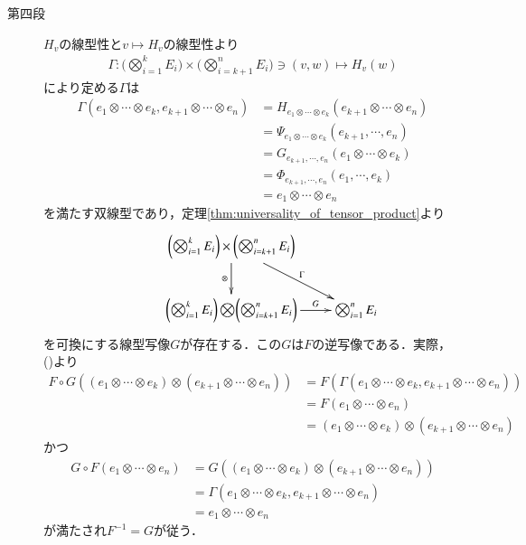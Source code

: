\begin{prf}
\begin{description}
			\item[第四段]
				$H_v$の線型性と$v \longmapsto H_v$の線型性より
				\begin{align}
					\Gamma:\biggl( \bigotimes_{i=1}^k E_i \biggr) \times \biggl( \bigotimes_{i=k+1}^n E_i \biggr) \ni (v,w) \longmapsto H_v(w)
				\end{align}
				により定める$\Gamma$は
				\begin{align}
					\Gamma(e_1 \otimes \cdots \otimes e_k, e_{k+1} \otimes \cdots \otimes e_n) 
					&= H_{e_1 \otimes \cdots \otimes e_k}\left(e_{k+1} \otimes \cdots \otimes e_n \right) \\
					&= \Psi_{e_1 \otimes \cdots \otimes e_k}\left(e_{k+1},\cdots,e_n \right) \\
					&= G_{e_{k+1},\cdots,e_n}\left(e_1 \otimes \cdots \otimes e_k \right) \\
					&= \Phi_{e_{k+1},\cdots,e_n}\left(e_1, \cdots, e_k \right) \\
					&= e_1 \otimes \cdots \otimes e_n
					\label{eq:thm_associativity_of_tensor_products}
				\end{align}
				を満たす双線型であり，定理\ref{thm:universality_of_tensor_product}より
				\begin{align}
					\xymatrix{
						&\biggl( \bigotimes_{i=1}^k E_i \biggr) \times \biggl( \bigotimes_{i=k+1}^n E_i \biggr) \ar[d]_-\otimes \ar[rd]^-{\Gamma} & \\
						&\biggl( \bigotimes_{i=1}^k E_i \biggr) \bigotimes \biggl( \bigotimes_{i=k+1}^n E_i \biggr) \ar[r]^-{G} & \bigotimes_{i=1}^n E_i
					}
				\end{align}
				を可換にする線型写像$G$が存在する．この$G$は$F$の逆写像である．実際，
				()より
				\begin{align}
					F \circ G \left( (e_1 \otimes \cdots \otimes e_k) \otimes (e_{k+1} \otimes \cdots \otimes e_n) \right)
					&= F \left(\Gamma(e_1 \otimes \cdots \otimes e_k, e_{k+1} \otimes \cdots \otimes e_n) \right) \\
					&= F (e_1 \otimes \cdots \otimes e_n) \\
					&= (e_1 \otimes \cdots \otimes e_k) \otimes (e_{k+1} \otimes \cdots \otimes e_n)
				\end{align}
				かつ
				\begin{align}
					G \circ F \left( e_1 \otimes \cdots \otimes e_n \right)
					&= G \left( (e_1 \otimes \cdots \otimes e_k) \otimes (e_{k+1} \otimes \cdots \otimes e_n) \right) \\
					&= \Gamma\left(e_1 \otimes \cdots \otimes e_k,e_{k+1} \otimes \cdots \otimes e_n \right) \\
					&= e_1 \otimes \cdots \otimes e_n
				\end{align}
				が満たされ$F^{-1} = G$が従う．
				\QED
		\end{description}
	\end{prf}